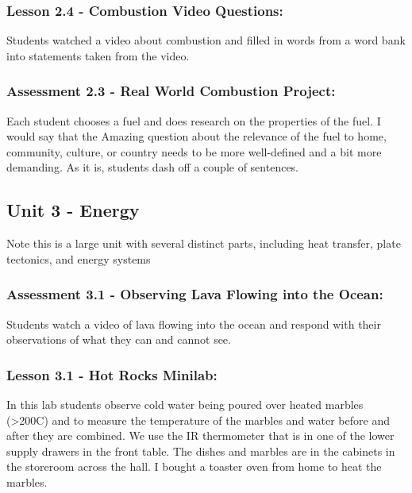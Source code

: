 \documentclass[11pt]{article}
\begin{document}
\subsubsection{Lesson 2.4 - Combustion Video Questions:}
\label{sec:orgaaa22a2}

Students watched a video about combustion and filled in words from a word bank into statements taken from the video.


\subsubsection{Assessment 2.3 - Real World Combustion Project:}
\label{sec:org2cbd3fc}

Each student chooses a fuel and does research on the properties of the fuel. I would say that the Amazing question about the
relevance of the fuel to home, community, culture, or country needs to be more well-defined and
a bit more demanding. As it is, students dash off a couple of sentences.


\subsection{Unit 3 - Energy}
\label{sec:org0880b75}

Note this is a large unit with several distinct parts, including heat transfer, plate tectonics, and energy systems

\subsubsection{Assessment 3.1 - Observing Lava Flowing into the Ocean:}
\label{sec:orga5563b3}

Students watch a video of lava flowing into the ocean and respond with their observations of what they can and cannot see.


\subsubsection{Lesson 3.1 - Hot Rocks Minilab:}
\label{sec:org68815a5}

In this lab students observe cold water being poured
over heated marbles (>200C) and to measure the temperature of the marbles and water
before and after they are combined. We use the IR thermometer that is in one of the
lower supply drawers in the front table. The dishes and marbles are in the cabinets in the
storeroom across the hall. I bought a toaster oven from home to heat the marbles.
\end{document}
